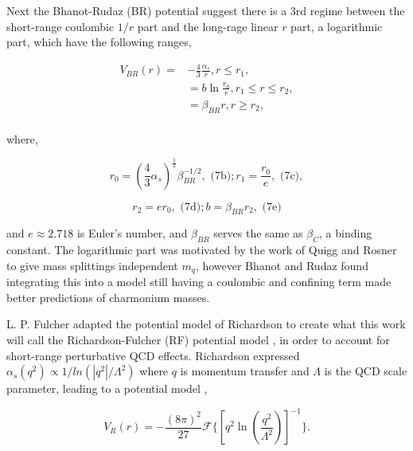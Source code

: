 \documentclass[10pt,twocolumn]{revtex4}    %
\begin{document}
Next the Bhanot-Rudaz (BR) potential \textbf{\cite{BhRoPaper}} suggest there is a 3rd regime between the short-range coulombic $1/r$ part and the long-rage linear $r$ part, a logarithmic part, which have the following ranges,

\begin{subequations}\label{eqn:BaRuV}
    \begin{equation}\label{eqn:BaRuPot}
        \begin{split}
        V_{BR}(r) = & -\frac{4}{3}\frac{\alpha_s}{r}, r \leq r_1, \\
                    &= b\ln{\frac{r_0}{r}}, r_1 \leq r \leq r_2, \\
                    & = \beta_{BR} r, r \geq r_2,\\
        \end{split}
    \end{equation}
\end{subequations}

where,

\begin{equation*}
    r_0 = (\frac{4}{3}\alpha_s)^{\frac{1}{2}} \beta_{BR}^{-1/2}, \text{   (7b)}; r_1 = \frac{r_0}{e}, \text{   (7c)},
\end{equation*}

\begin{equation*}
    r_2 = er_0, \text{   (7d)}; b = \beta_{BR}r_2 , \text{   (7e)}
\end{equation*}

and $e \approx 2.718$ is Euler's number, and $\beta_{BR}$ serves the same as $\beta_{C}$, a binding constant. The logarithmic part was motivated by the work of Quigg and Rosner to  give mass splittings independent $m_q$, however Bhanot and Rudaz found integrating this into a model still having a coulombic and confining term made better predictions of charmonium masses. 


L. P. Fulcher adapted the potential model of Richardson to create what this work will call the Richardson-Fulcher (RF) potential model \textbf{\cite{RichardsonPaper}}, in order to account for short-range perturbative QCD effects. Richardson expressed $\alpha_s(q^2) \propto 1/ln(|q^2|/\Lambda^2)$ where $q$ is  momentum transfer and $\Lambda$ is the QCD scale parameter, leading to a potential model \textbf{\cite{donoghue}},

\begin{equation}
    V_R(r) = -\frac{(8\pi)^2}{27}\mathcal{F}\{[q^2\ln{(\frac{q^2}{\Lambda^2})}]^{-1}\}.
\end{equation}
\end{document}
